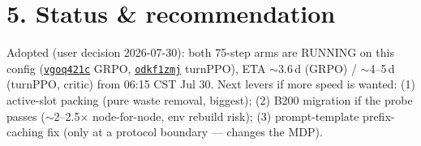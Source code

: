 \documentclass[10pt]{article}
\newcommand{\code}[1]{\texttt{\small #1}}
\begin{document}
\section*{5. Status \& recommendation}
Adopted (user decision 2026-07-30): both 75-step arms are RUNNING on this config
(\href{https://wandb.ai/rainyfields/ca-rung3-8b-asearcher/runs/vgoq421c}{\code{vgoq421c}} GRPO,
\href{https://wandb.ai/rainyfields/ca-rung3-8b-asearcher/runs/odkf1zmj}{\code{odkf1zmj}} turnPPO),
ETA $\sim$3.6\,d (GRPO) / $\sim$4--5\,d (turnPPO, critic) from 06:15 CST Jul 30.
Next levers if more speed is wanted: (1) active-slot packing (pure waste removal, biggest);
(2) B200 migration if the probe passes ($\sim$2--2.5$\times$ node-for-node, env rebuild risk);
(3) prompt-template prefix-caching fix (only at a protocol boundary --- changes the MDP).
\end{document}
